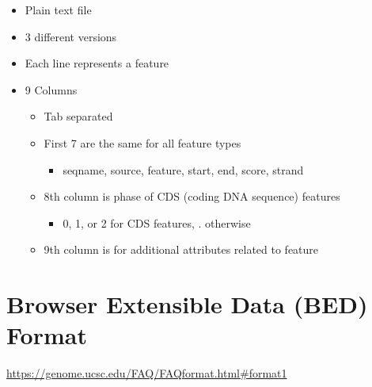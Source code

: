 \documentclass[
]{book}
\providecommand{\tightlist}{%
  \setlength{\itemsep}{0pt}\setlength{\parskip}{0pt}}
\begin{document}
\begin{itemize}
\tightlist
\item
  Plain text file
\item
  3 different versions
\item
  Each line represents a feature
\item
  9 Columns

  \begin{itemize}
  \tightlist
  \item
    Tab separated
  \item
    First 7 are the same for all feature types

    \begin{itemize}
    \tightlist
    \item
      seqname, source, feature, start, end, score, strand
    \end{itemize}
  \item
    8th column is phase of CDS (coding DNA sequence) features

    \begin{itemize}
    \tightlist
    \item
      0, 1, or 2 for CDS features, . otherwise
    \end{itemize}
  \item
    9th column is for additional attributes related to feature
  \end{itemize}
\end{itemize}

\hypertarget{browser-extensible-data-bed-format}{%
\section{Browser Extensible Data (BED) Format}\label{browser-extensible-data-bed-format}}

\url{https://genome.ucsc.edu/FAQ/FAQformat.html\#format1}
\end{document}
